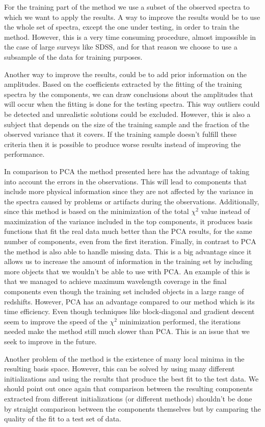 \documentclass[12pt,preprint]{aastex}
\begin{document}
For the training part of the method we use a subset of the observed spectra to which we want to apply the results. A way to improve the results would be to use the whole set of spectra, except the one under testing, in order to train the method. However, this is a very time consuming procedure, almost impossible in the case of large surveys like SDSS, and for that reason we choose to use a subsample of the data for training purposes.

Another way to improve the results, could be to add prior information on the amplitudes. Based on the coefficients extracted by the fitting of the training spectra by the components, we can draw conclusions about the amplitudes that will occur when the fitting is done for the testing spectra. This way outliers could be detected and unrealistic solutions could be excluded. However, this is also a subject that depends on the size of the training sample and the fraction of the observed variance that it covers. If the training sample doesn't fulfill these criteria then it is possible to produce worse results instead of improving the performance.

In comparison to PCA the method presented here has the advantage of taking into account the errors in the observations. This will lead to components that include more physical information since they are not affected by the variance in the spectra caused by problems or artifacts during the observations. Additionally, since this method is based on the minimization of the total $\chi^2$ value instead of maximization of the variance included in the top components, it produces basis functions that fit the real data much better than the PCA results, for the same number of components, even from the first iteration. Finally, in contrast to PCA the method is also able to handle missing data. This is a big advantage since it allows us to increase the amount of information in the training set by including more objects that we wouldn't be able to use with PCA. An example of this is that we managed to achieve maximum wavelength coverage in the final components even though the training set included objects in a large range of redshifts. However, PCA has an advantage compared to our method which is its time efficiency. Even though techniques like block-diagonal and gradient descent seem to improve the speed of the $\chi^2$ minimization performed, the iterations needed make the method still much slower than PCA. This is an issue that we seek to improve in the future.

Another problem of the method is the existence of many local minima in the resulting basis space. However, this can be solved by using many different initializations and using the results that produce the best fit to the test data. We should point out once again that comparison between the resulting components extracted from different initializations (or different methods) shouldn't be done by straight comparison between the components themselves but by camparing the quality of the fit to a test set of data.
\end{document}
